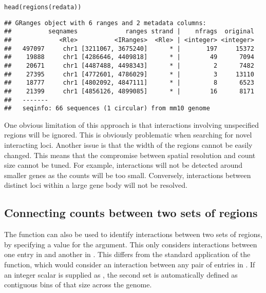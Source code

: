 \documentclass{report}\usepackage[]{graphicx}\usepackage[usenames,dvipsnames]{color}
\newcommand{\hlstd}[1]{\textcolor[rgb]{0.251,0.251,0.251}{#1}}%
\newcommand{\hlkwd}[1]{\textcolor[rgb]{0.878,0.439,0.125}{#1}}%
\newenvironment{knitrout}{}{} %
\begin{document}
\begin{knitrout}
\color{fgcolor}\begin{kframe}
\begin{alltt}
\hlkwd{head}\hlstd{(}\hlkwd{regions}\hlstd{(redata))}
\end{alltt}
\begin{verbatim}
## GRanges object with 6 ranges and 2 metadata columns:
##          seqnames             ranges strand |    nfrags  original
##             <Rle>          <IRanges>  <Rle> | <integer> <integer>
##   497097     chr1 [3211067, 3675240]      * |       197     15372
##    19888     chr1 [4286646, 4409818]      * |        49      7094
##    20671     chr1 [4487488, 4498343]      * |         2      7482
##    27395     chr1 [4772601, 4786029]      * |         3     13110
##    18777     chr1 [4802092, 4847111]      * |         8      6523
##    21399     chr1 [4856126, 4899085]      * |        16      8171
##   -------
##   seqinfo: 66 sequences (1 circular) from mm10 genome
\end{verbatim}
\end{kframe}
\end{knitrout}

One obvious limitation of this approach is that interactions involving unspecified regions will be ignored.
This is obviously problematic when searching for novel interacting loci.
Another issue is that the width of the regions cannot be easily changed.
This means that the compromise between spatial resolution and count size cannot be tuned.
For example, interactions will not be detected around smaller genes as the counts will be too small.
Conversely, interactions between distinct loci within a large gene body will not be resolved.

\subsection{Connecting counts between two sets of regions}
The  function can also be used to identify interactions between two sets of regions, by specifying a value for the  argument.
This only considers interactions between one entry in  and another in .
This differs from the standard application of the function, which would consider an interaction between any pair of entries in .
If an integer scalar is supplied as , the second set is automatically defined as contiguous bins of that size across the genome.
\end{document}
